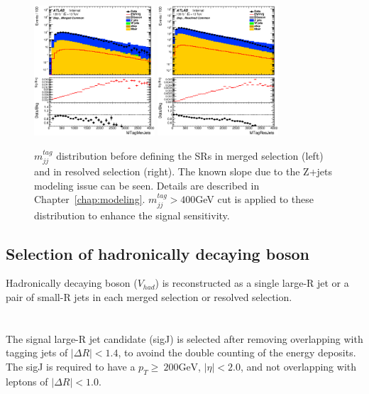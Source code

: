 \begin{figure}[ht]
    \centering
    \includegraphics[width=0.4\textwidth]{figures/2lep/dataMC/C_0ptag1pfat0pjet_0ptv_MergedCommon_MTagMerJets_Log}
    \includegraphics[width=0.4\textwidth]{figures/2lep/dataMC/C_0ptag2pjet_0ptv_ResolvedCommon_MTagResJets_Log} 
    \caption{$m^{tag}_{jj}$ distribution before defining the SRs in merged selection (left) and in resolved selection (right). The known slope due to the Z+jets modeling issue can be seen. Details are described in Chapter~\ref{chap:modeling}. $m^{tag}_{jj} > 400$GeV cut is applied to these distribution to enhance the signal sensitivity.}
    \label{fig:Mtagjj}
\end{figure}

\subsection{Selection of hadronically decaying boson}
Hadronically decaying boson ($V_{had}$) is reconstructed as a single large-R jet or a pair of small-R jets in each merged selection or resolved selection. \\ \\
\noindent\textbf{}  \\
The signal large-R jet candidate (sigJ) is selected after removing overlapping with tagging jets of $|\Delta R|<1.4$, to avoind the double counting of the energy deposits. The sigJ is required to have a $p_{T} \geq ~200 \mathrm{GeV}$, $|\eta| < 2.0$, and not overlapping with leptons of $|\Delta R|<1.0$.

